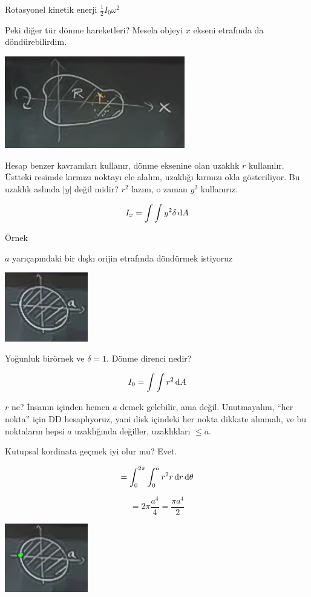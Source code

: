 \documentclass[12pt,fleqn]{article}\usepackage{../../common}
\begin{document}
Rotasyonel kinetik enerji $\frac{1}{2}I_0 \omega^2$

Peki diğer tür dönme hareketleri? Mesela objeyi $x$ ekseni etrafında da
döndürebilirdim. 

\includegraphics[height=4cm]{17_6.png}

Hesap benzer kavramları kullanır, dönme eksenine olan uzaklık $r$
kullanılır. Üstteki resimde kırmızı noktayı ele alalım, uzaklığı kırmızı okla
gösteriliyor. Bu uzaklık aslında $|y|$ değil midir? $r^2$ lazım, o zaman $y^2$
kullanırız.

$$ I_x = \int \int y^2 \delta \,\mathrm{d} A $$

Örnek

$a$ yarıçapındaki bir dışkı orijin etrafında döndürmek istiyoruz 

\includegraphics[height=3cm]{17_7.png}

Yoğunluk birörnek ve $\delta = 1$. Dönme direnci nedir? 

$$ I_0 = \int \int r^2 \,\mathrm{d} A $$

$r$ ne? İnsanın içinden hemen $a$ demek gelebilir, ama değil. Unutmayalım, ``her
nokta'' için DD hesaplıyoruz, yani disk içindeki her nokta dikkate alınmalı, ve
bu noktaların hepsi $a$ uzaklığında değiller, uzaklıkları $\le a$.

Kutupsal kordinata geçmek iyi olur mu? Evet. 

$$ = \int_0^{2\pi} \int_0^a r^2 r \,\mathrm{d} r \,\mathrm{d}\theta $$

$$ = 2\pi \frac{a^4}{4} = \frac{\pi a^4}{2} $$

\includegraphics[height=3cm]{17_8.png}
\end{document}
